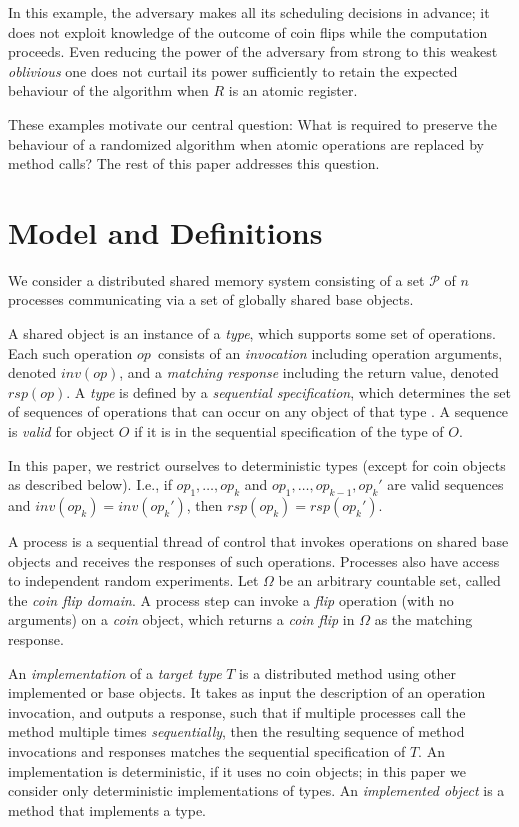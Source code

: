 \documentclass[11pt,letterpaper]{article}
\newcommand{\PP}{\mathcal{P}}
\newcommand{\obj}{\ensuremath{\mathit{O}}}
\newcommand{\op}{\ensuremath{\mathit{op}}}
\newcommand{\inv}[1]{\ensuremath{inv(#1)}}
\newcommand{\rsp}[1]{\ensuremath{rsp(#1)}}
\begin{document}
In this example, the adversary makes all its scheduling decisions in advance;
it does not exploit knowledge of the outcome of coin flips while the computation proceeds.
Even reducing the power of the adversary from strong to this weakest \emph{oblivious} one
does not curtail its power sufficiently to retain the expected behaviour of the algorithm
when $R$ is an atomic register.

These examples motivate our central question:
What is required to preserve the behaviour of a randomized algorithm
when atomic operations are replaced by method calls?
The rest of this paper addresses this question.



\section{Model and Definitions}
\label{model.sec}


We consider a distributed shared memory system consisting of a set $\PP$ of $n$ processes communicating via a set of globally shared base objects.

A shared object is an instance of a \emph{type}, which supports some set of operations.
Each such operation \op\ consists of an \emph{invocation} including operation arguments, denoted \inv{\op},
and a \emph{matching response} including the return value, denoted \rsp{\op}.
A \emph{type} is defined by a \emph{sequential specification}, which determines the set of sequences of operations that can occur on any object of that type \cite{her:lin}.
A sequence is \emph{valid} for object $\obj$ if it is in the sequential specification of the type of \obj.

In this paper, we restrict ourselves to deterministic types (except for coin objects as described below).
I.e., if $\op_1,\dots,\op_k$ and $\op_1,\dots,\op_{k-1},\op_k'$ are valid sequences and $\inv{\op_k}=\inv{\op_k'}$, then $\rsp{\op_k}=\rsp{\op_k'}$.

A process is a sequential thread of control that invokes operations on shared base objects and receives the responses of such operations.
Processes also have access to independent random experiments.
Let $\Omega$ be an arbitrary countable set, called the \emph{coin flip domain}.
A process step can invoke a \emph{flip} operation (with no arguments) on a \emph{coin} object,
which returns a \emph{coin flip} in $\Omega$ as the matching response.

An \emph{implementation} of a \emph{target type} $T$ is a distributed method using other implemented or base objects.
It takes as input the description of an operation invocation, and outputs a response, such that if multiple processes call the method multiple times \emph{sequentially}, then the resulting sequence of method invocations and responses matches the sequential specification of $T$. 
An implementation is deterministic, if it uses no coin objects; in this paper we consider only deterministic implementations of types.
An \emph{implemented object} is a method that implements a type.
\end{document}
